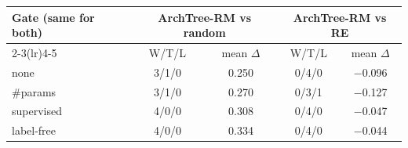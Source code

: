 \begin{tabular}{@{}lcccc@{}}
\toprule
\multirow{2}{*}{Gate (same for both)} & \multicolumn{2}{c}{ArchTree-RM vs random} & \multicolumn{2}{c}{ArchTree-RM vs RE}\\
\cmidrule(lr){2-3}\cmidrule(lr){4-5}
 & W/T/L & mean $\Delta$ & W/T/L & mean $\Delta$\\
\midrule
none & 3/1/0 & 0.250 & 0/4/0 & $-$0.096\\
\#params & 3/1/0 & 0.270 & 0/3/1 & $-$0.127\\
supervised & 4/0/0 & 0.308 & 0/4/0 & $-$0.047\\
label-free & 4/0/0 & 0.334 & 0/4/0 & $-$0.044\\
\bottomrule
\end{tabular}
